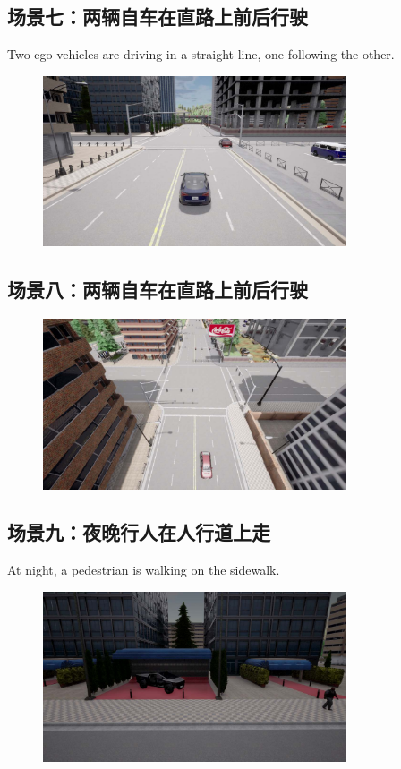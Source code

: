 \subsection {场景七：两辆自车在直路上前后行驶}
\indent Two ego vehicles are driving in a straight line, one following the other.\\
\begin{figure}[H]
	\centering
	\includegraphics[width=0.8\textwidth]{"images/场景7.pdf"}
	\caption{}
	\label{}
\end{figure}
\subsection {场景八：两辆自车在直路上前后行驶}
\begin{figure}[H]
	\centering
	\includegraphics[width=0.8\textwidth]{"images/场景8.pdf"}
	\caption{}
	\label{}
\end{figure}
\subsection {场景九：夜晚行人在人行道上走}
\indent At night, a pedestrian is walking on the sidewalk.\\
\begin{figure}[H]
	\centering
	\includegraphics[width=0.8\textwidth]{"images/场景9.pdf"}
	\caption{}
	\label{}
\end{figure}
